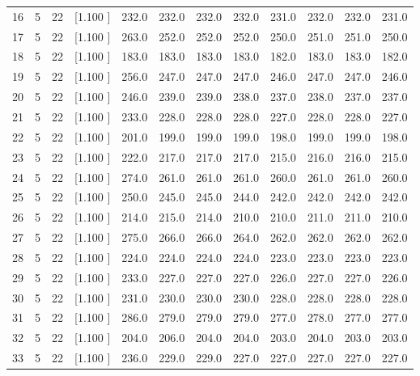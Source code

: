 \documentclass[12pt,a4paper]{article}
\begin{document}
\begin{center}
{\begin{tabular}{r r r r r r r r r r r r}
  16&  5& 22&[1.100     ]&   232.0&   232.0&   232.0&   232.0&   231.0&   232.0&   232.0&   231.0\\[-0.02in]
  17&  5& 22&[1.100     ]&   263.0&   252.0&   252.0&   252.0&   250.0&   251.0&   251.0&   250.0\\[-0.02in]
  18&  5& 22&[1.100     ]&   183.0&   183.0&   183.0&   183.0&   182.0&   183.0&   183.0&   182.0\\[-0.02in]
  19&  5& 22&[1.100     ]&   256.0&   247.0&   247.0&   247.0&   246.0&   247.0&   247.0&   246.0\\[-0.02in]
  20&  5& 22&[1.100     ]&   246.0&   239.0&   239.0&   238.0&   237.0&   238.0&   237.0&   237.0\\[-0.02in]
  21&  5& 22&[1.100     ]&   233.0&   228.0&   228.0&   228.0&   227.0&   228.0&   228.0&   227.0\\[-0.02in]
  22&  5& 22&[1.100     ]&   201.0&   199.0&   199.0&   199.0&   198.0&   199.0&   199.0&   198.0\\[-0.02in]
  23&  5& 22&[1.100     ]&   222.0&   217.0&   217.0&   217.0&   215.0&   216.0&   216.0&   215.0\\[-0.02in]
  24&  5& 22&[1.100     ]&   274.0&   261.0&   261.0&   261.0&   260.0&   261.0&   261.0&   260.0\\[-0.02in]
  25&  5& 22&[1.100     ]&   250.0&   245.0&   245.0&   244.0&   242.0&   242.0&   242.0&   242.0\\[-0.02in]
  26&  5& 22&[1.100     ]&   214.0&   215.0&   214.0&   210.0&   210.0&   211.0&   211.0&   210.0\\[-0.02in]
  27&  5& 22&[1.100     ]&   275.0&   266.0&   266.0&   264.0&   262.0&   262.0&   262.0&   262.0\\[-0.02in]
  28&  5& 22&[1.100     ]&   224.0&   224.0&   224.0&   224.0&   223.0&   223.0&   223.0&   223.0\\[-0.02in]
  29&  5& 22&[1.100     ]&   233.0&   227.0&   227.0&   227.0&   226.0&   227.0&   227.0&   226.0\\[-0.02in]
  30&  5& 22&[1.100     ]&   231.0&   230.0&   230.0&   230.0&   228.0&   228.0&   228.0&   228.0\\[-0.02in]
  31&  5& 22&[1.100     ]&   286.0&   279.0&   279.0&   279.0&   277.0&   278.0&   277.0&   277.0\\[-0.02in]
  32&  5& 22&[1.100     ]&   204.0&   206.0&   204.0&   204.0&   203.0&   204.0&   203.0&   203.0\\[-0.02in]
  33&  5& 22&[1.100     ]&   236.0&   229.0&   229.0&   227.0&   227.0&   227.0&   227.0&   227.0\\[-0.02in]

\end{tabular}}
\end{center}
\end{document}
